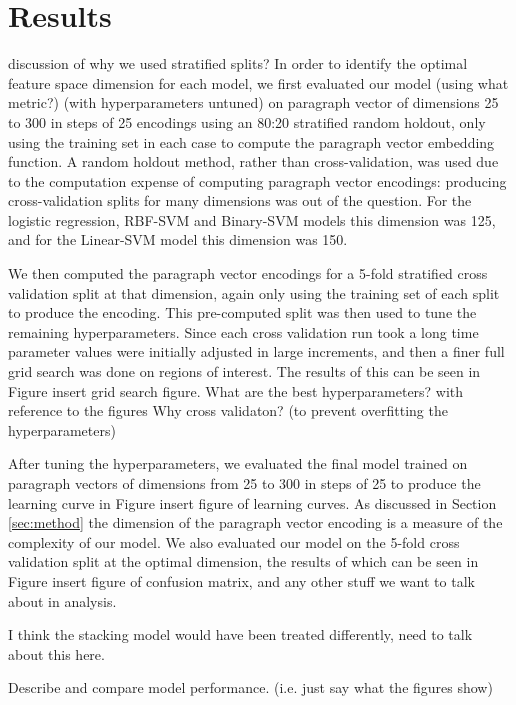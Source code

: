 \documentclass[11pt]{article}
\newcommand{\drafting}[1]{\textcolor{OliveGreen}{#1}}
\begin{document}
\section{Results}
\drafting{discussion of why we used stratified splits?}
In order to identify the optimal feature space dimension for each model, we first evaluated our model \drafting{(using what metric?)} (with hyperparameters untuned) on paragraph vector of dimensions 25 to 300 in steps of 25 encodings using an 80:20 stratified random holdout, only using the training set in each case to compute the paragraph vector embedding function. A random holdout method, rather than cross-validation, was used due to the computation expense of computing paragraph vector encodings: producing cross-validation splits for many dimensions was out of the question. For the \drafting{logistic regression}, RBF-SVM and Binary-SVM models this dimension was 125, and for the Linear-SVM model this dimension was 150. 

We then computed the paragraph vector encodings for a 5-fold stratified cross validation split at that dimension, again only using the training set of each split to produce the encoding. This pre-computed split was then used to tune the remaining hyperparameters. Since each cross validation run \drafting{took a long time} parameter values were initially adjusted in large increments, and then a finer full grid search was done on regions of interest. The results of this can be seen in Figure \drafting{insert grid search figure}.  \drafting{What are the best hyperparameters? with reference to the figures} \drafting{Why cross validaton? (to prevent overfitting the hyperparameters)} 

After tuning the hyperparameters, we evaluated the final model trained on paragraph vectors of dimensions from 25 to 300 in steps of 25 to produce the learning curve in Figure \drafting{insert figure of learning curves}. As discussed in Section \ref{sec:method} the dimension of the paragraph vector encoding is a measure of the complexity of our model. We also evaluated our model on the 5-fold cross validation split at the optimal dimension, the results of which can be seen in Figure \drafting{insert figure of confusion matrix, and any other stuff we want to talk about in analysis}.

\drafting{I think the stacking model would have been treated differently, need to talk about this here.}

\drafting{
Describe and compare model performance. (i.e. just say what the figures show)
}
\end{document}
